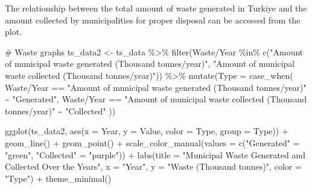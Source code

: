 \documentclass[
  11pt,
  a4paper,
  DIV=11,
  numbers=noendperiod]{scrartcl}
\newenvironment{Shaded}{\begin{snugshade}}{\end{snugshade}}
\newcommand{\AttributeTok}[1]{\textcolor[rgb]{0.40,0.45,0.13}{#1}}
\newcommand{\CommentTok}[1]{\textcolor[rgb]{0.37,0.37,0.37}{#1}}
\newcommand{\FunctionTok}[1]{\textcolor[rgb]{0.28,0.35,0.67}{#1}}
\newcommand{\NormalTok}[1]{\textcolor[rgb]{0.00,0.23,0.31}{#1}}
\newcommand{\OtherTok}[1]{\textcolor[rgb]{0.00,0.23,0.31}{#1}}
\newcommand{\SpecialCharTok}[1]{\textcolor[rgb]{0.37,0.37,0.37}{#1}}
\newcommand{\StringTok}[1]{\textcolor[rgb]{0.13,0.47,0.30}{#1}}
\begin{document}
The relationship between the total amount of waste generated in Turkiye
and the amount collected by municipalities for proper disposal can be
accessed from the plot.

\begin{Shaded}
\begin{Highlighting}[]
\CommentTok{\# Waste graphs}
\NormalTok{ts\_data2 }\OtherTok{\textless{}{-}}\NormalTok{ ts\_data }\SpecialCharTok{\%\textgreater{}\%}
  \FunctionTok{filter}\NormalTok{(}\StringTok{\textasciigrave{}}\AttributeTok{Waste/Year}\StringTok{\textasciigrave{}} \SpecialCharTok{\%in\%} \FunctionTok{c}\NormalTok{(}\StringTok{"Amount of municipal waste generated (Thousand tonnes/year)"}\NormalTok{, }
                             \StringTok{"Amount of municipal waste collected (Thousand tonnes/year)"}\NormalTok{)) }\SpecialCharTok{\%\textgreater{}\%}
  \FunctionTok{mutate}\NormalTok{(}\AttributeTok{Type =} \FunctionTok{case\_when}\NormalTok{(}
    \StringTok{\textasciigrave{}}\AttributeTok{Waste/Year}\StringTok{\textasciigrave{}} \SpecialCharTok{==} \StringTok{"Amount of municipal waste generated (Thousand tonnes/year)"} \SpecialCharTok{\textasciitilde{}} \StringTok{"Generated"}\NormalTok{,}
    \StringTok{\textasciigrave{}}\AttributeTok{Waste/Year}\StringTok{\textasciigrave{}} \SpecialCharTok{==} \StringTok{"Amount of municipal waste collected (Thousand tonnes/year)"} \SpecialCharTok{\textasciitilde{}} \StringTok{"Collected"}
\NormalTok{  ))}

\FunctionTok{ggplot}\NormalTok{(ts\_data2, }\FunctionTok{aes}\NormalTok{(}\AttributeTok{x =}\NormalTok{ Year, }\AttributeTok{y =}\NormalTok{ Value, }\AttributeTok{color =}\NormalTok{ Type, }\AttributeTok{group =}\NormalTok{ Type)) }\SpecialCharTok{+}
  \FunctionTok{geom\_line}\NormalTok{() }\SpecialCharTok{+}
  \FunctionTok{geom\_point}\NormalTok{() }\SpecialCharTok{+}
  \FunctionTok{scale\_color\_manual}\NormalTok{(}\AttributeTok{values =} \FunctionTok{c}\NormalTok{(}\StringTok{"Generated"} \OtherTok{=} \StringTok{"green"}\NormalTok{, }\StringTok{"Collected"} \OtherTok{=} \StringTok{"purple"}\NormalTok{)) }\SpecialCharTok{+}
  \FunctionTok{labs}\NormalTok{(}\AttributeTok{title =} \StringTok{"Municipal Waste Generated and Collected Over the Years"}\NormalTok{,}
       \AttributeTok{x =} \StringTok{"Year"}\NormalTok{, }
       \AttributeTok{y =} \StringTok{"Waste (Thousand tonnes)"}\NormalTok{,}
       \AttributeTok{color =} \StringTok{"Type"}\NormalTok{) }\SpecialCharTok{+} 
  \FunctionTok{theme\_minimal}\NormalTok{()}
\end{Highlighting}
\end{Shaded}
\end{document}
